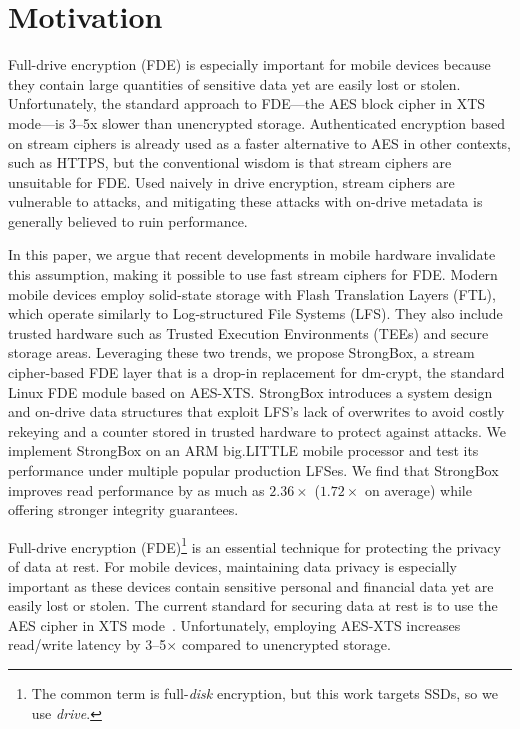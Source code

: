 \section{Motivation} \label{sec:sb-motivation}

Full-drive encryption (FDE) is especially important for mobile devices because
they contain large quantities of sensitive data yet are easily lost or stolen.
Unfortunately, the standard approach to FDE---the AES block cipher in XTS
mode---is 3--5x slower than unencrypted storage. Authenticated encryption based on
stream ciphers is already used as a faster alternative to AES in other contexts,
such as HTTPS, but the conventional wisdom is that stream ciphers are unsuitable
for FDE. Used naively in drive encryption, stream ciphers are vulnerable to
attacks, and mitigating these attacks with on-drive metadata is generally
believed to ruin performance.

In this paper, we argue that recent developments in mobile hardware invalidate
this assumption, making it possible to use fast stream ciphers for FDE. Modern
mobile devices employ solid-state storage with Flash Translation Layers (FTL),
which operate similarly to Log-structured File Systems (LFS). They also include
trusted hardware such as Trusted Execution Environments (TEEs) and secure
storage areas. Leveraging these two trends, we propose StrongBox, a stream
cipher-based FDE layer that is a drop-in replacement for dm-crypt, the standard
Linux FDE module based on AES-XTS. StrongBox introduces a system design and
on-drive data structures that exploit LFS's lack of overwrites to avoid costly
rekeying and a counter stored in trusted hardware to protect against attacks. We
implement StrongBox on an ARM big.LITTLE mobile processor and test its
performance under multiple popular production LFSes. We find that StrongBox
improves read performance by as much as $2.36\times$ ($1.72\times$ on average)
while offering stronger integrity guarantees.

Full-drive encryption (FDE)\footnote{The common term is full-\emph{disk}
encryption, but this work targets SSDs, so we use \emph{drive}.} is an essential
technique for protecting the privacy of data at rest. For mobile devices,
maintaining data privacy is especially important as these devices contain
sensitive personal and financial data yet are easily lost or stolen. The current
standard for securing data at rest is to use the AES cipher in XTS
mode~\cite{XTS, NISTXTS}. Unfortunately, employing AES-XTS increases
read/write latency by 3--5$\times$ compared to unencrypted storage.

